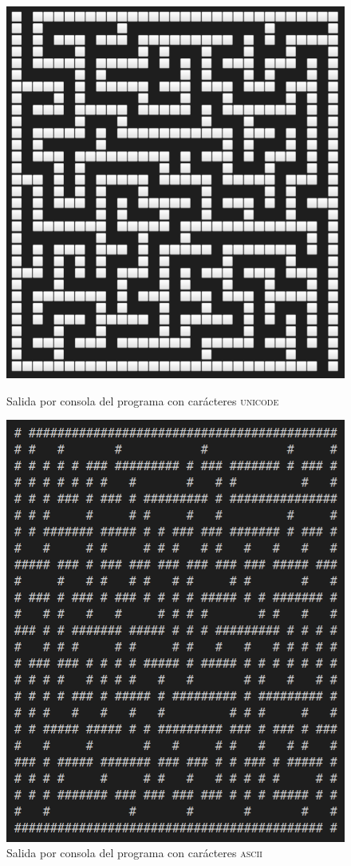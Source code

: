\documentclass[12pt,a4paper]{article}
\begin{document}
\begin{figure}[H]
	\centering
	\includegraphics[scale=0.4]{fotos/unicode.png}
	\caption{Salida por consola del programa con carácteres \textsc{unicode}}
	\label{unicode}
	\centering
	\includegraphics[scale=0.4]{fotos/asci.png}
	\caption{Salida por consola del programa con carácteres \textsc{ascii}}
	\label{ascii}
\end{figure}
\end{document}
